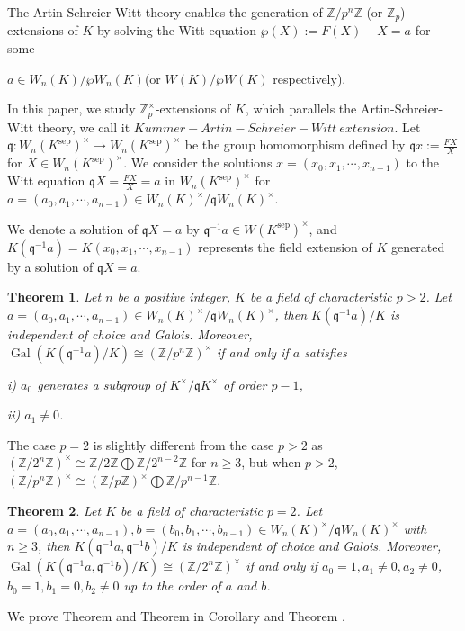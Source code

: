\documentclass{proc-l}
\newtheorem{theorem}{Theorem}[section]
\theoremstyle{definition}
\theoremstyle{remark}
\numberwithin{equation}{section}
\DeclareMathOperator{\Gal}{Gal}
\DeclareMathOperator{\sep}{sep}
\begin{document}
The Artin-Schreier-Witt theory \cite{MR3754335,Thomas} enables the generation of $\mathbb Z/p^n\mathbb Z$ (or $\mathbb Z_p$) extensions of $K$ by solving the Witt equation $\wp(X):=F(X)-X=a$ for some {$a\in W_n(K)/\wp W_n(K)$(or $W(K)/\wp W(K)$ respectively).

In this paper, we study $\mathbb Z_p^\times$-extensions of $K$, which parallels the Artin-Schreier-Witt theory, we call it $Kummer-Artin-Schreier-Witt~extension$. Let $\mathfrak q:W_n(K^{\sep})^\times\rightarrow W_n(K^{\sep})^\times$ be the group homomorphism defined by $\mathfrak qx:=\frac{FX}{X}$ for $X\in W_n(K^{\sep})^\times$. We consider the solutions $x=(x_0,x_1,\cdots,x_{n-1})$ to the Witt equation $\mathfrak qX=\frac{FX}{X}=a$ in $W_n(K^{\sep})^\times$ for $a=(a_0,a_1,\cdots,a_{n-1})\in W_n(K)^\times/\mathfrak qW_n(K)^\times$. 

We denote a solution of $\mathfrak qX=a$ by $\mathfrak q^{-1}a\in W(K^{\sep})^\times$, and $K(\mathfrak q^{-1}a)=K(x_0,x_1,\cdots,x_{n-1})$ represents the field extension of $K$ generated by a solution of $\mathfrak qX=a$.

\begin{theorem}\label{thm2}
     Let $n$ be a positive integer, $K$ be a field of characteristic $p>2$. Let $a=(a_0,a_1,\cdots,a_{n-1})\in W_n(K)^\times/\mathfrak qW_n(K)^\times$, then $K(\mathfrak q^{-1}a)/K$ is independent of choice and Galois. Moreover, $\Gal(K(\mathfrak q^{-1}a)/K)\cong(\mathbb Z/p^n\mathbb Z)^\times$ if and only if $a$ satisfies

    i) $a_0$ generates a subgroup of  $K^\times/\mathfrak qK^\times$ of order $p-1$,
    
    ii) $a_1\neq0$.
\end{theorem}
The case $p=2$ is slightly different from the case $p>2$ as $(\mathbb Z/2^n\mathbb Z)^\times\cong \mathbb Z/2\mathbb Z\bigoplus \mathbb Z/2^{n-2}\mathbb Z$ for $n\geq3$, but when $p>2$, $(\mathbb Z/p^n\mathbb Z)^\times\cong(\mathbb Z/p\mathbb Z)^\times\bigoplus\mathbb Z/p^{n-1}\mathbb Z$. 
\begin{theorem}\label{1.2}
    Let $K$ be a field of characteristic $p=2$. Let $a=(a_0,a_1,\cdots,a_{n-1}),b=(b_0,b_1,\cdots,b_{n-1})\in W_n(K)^\times/\mathfrak qW_n(K)^\times$ with $n\geq3$, then $K(\mathfrak q^{-1}a,\mathfrak q^{-1}b)/K$ is independent of choice and Galois. Moreover,  $\Gal(K(\mathfrak q^{-1}a,\mathfrak q^{-1}b)/K)\cong (\mathbb Z/2^{n}\mathbb Z)^\times$ if and only if $a_0=1,a_1\neq0,a_2\neq0$, $b_0=1,b_1=0,b_2\neq0$ up to the order of $a$ and $b$.
\end{theorem}
We prove Theorem \boxed{\ref{thm2}} and Theorem \boxed{\ref{1.2}} in Corollary \boxed{\ref{2.10}} and Theorem \boxed{\ref{2.17}}. %

}
\end{document}
